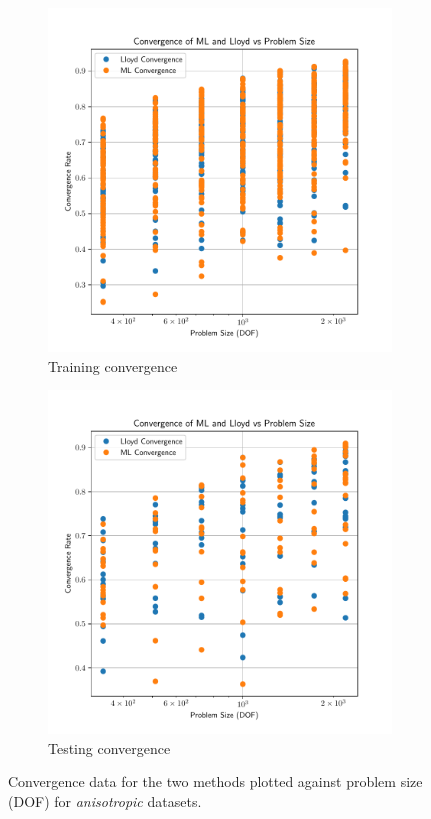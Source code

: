 \documentclass{article}
\begin{document}
\bigskip\bigskip
\begin{figure}[!htb]
  \centering
  \begin{subfigure}[t]{0.49\textwidth}
    \centering
    \includegraphics[width=\textwidth]{aniso3d_train_convergence_per_size.pdf}
    \caption{Training convergence}
  \end{subfigure}
  \begin{subfigure}[t]{0.49\textwidth}
    \centering
    \includegraphics[width=\textwidth]{aniso3d_test_convergence_per_size.pdf}
    \caption{Testing convergence}
  \end{subfigure}
  \caption{Convergence data for the two methods plotted against problem size (DOF) for \textit{anisotropic} datasets.}
  \label{fig:aniso_conv_per_size}
\end{figure}
\end{document}

